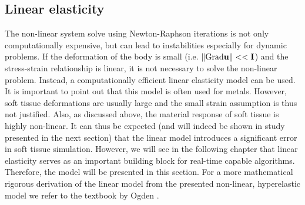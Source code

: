 \subsection{Linear elasticity}
The non-linear system solve using Newton-Raphson iterations is not only computationally expensive, but can lead to instabilities especially for dynamic problems. If the deformation of the body is small (i.e. $\left\|  \textnormal{Grad} \mathbf {u} \right\|<< \mathbf {I }$) and the stress-strain relationship is linear, it is not necessary to solve the non-linear problem. Instead, a computationally efficient linear elasticity model can be used. It is important to point out that this model is often used for metals. However, soft tissue deformations are usually large and the small strain assumption is thus not justified. Also, as discussed above, the material response of soft tissue is highly non-linear. It can thus be expected (and will indeed be shown in study presented in the next section) that the linear model introduces a significant error in soft tissue simulation. However, we will see in the following chapter that linear elasticity serves as an important building block for real-time capable algorithms. Therefore, the model will be presented in this section. For a more mathematical rigorous derivation of the linear model from the presented non-linear, hyperelastic model we refer to the textbook by Ogden \cite{Ogden1997}.

